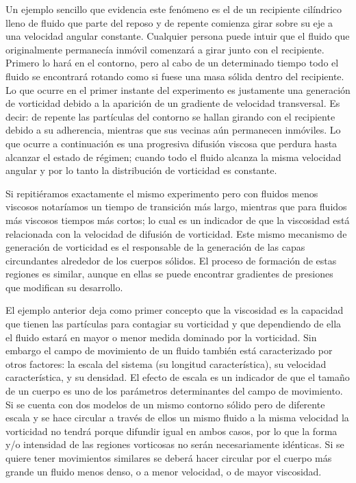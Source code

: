 \documentclass[12pt,twoside,onecolumn,openany]{article}
\begin{document}
Un ejemplo sencillo que evidencia este fenómeno es el de un recipiente cilíndrico lleno de fluido que parte del reposo y de repente comienza girar sobre su eje a una velocidad angular constante. Cualquier persona puede intuir que el fluido que originalmente permanecía inmóvil comenzará a girar junto con el recipiente. Primero lo hará en el contorno, pero al cabo de un determinado tiempo todo el fluido se encontrará rotando como si fuese una masa sólida dentro del recipiente. Lo que ocurre en el primer instante del experimento es justamente una generación de vorticidad debido a la aparición de un gradiente de velocidad transversal. Es decir: de repente las partículas del contorno se hallan girando con el recipiente debido a su adherencia, mientras que sus vecinas aún permanecen inmóviles. Lo que ocurre a continuación es una progresiva difusión viscosa que perdura hasta alcanzar el estado de régimen; cuando todo el fluido alcanza la misma velocidad angular y por lo tanto la distribución de vorticidad es constante.

Si repitiéramos exactamente el mismo experimento pero con fluidos menos viscosos notaríamos un tiempo de transición más largo, mientras que para fluidos más viscosos tiempos más cortos; lo cual es un indicador de que la viscosidad está relacionada con la velocidad de difusión de vorticidad. Este mismo mecanismo de generación de vorticidad es el responsable de la generación de las capas circundantes alrededor de los cuerpos sólidos. El proceso de formación de estas regiones es similar, aunque en ellas se puede encontrar gradientes de presiones que modifican su desarrollo.

El ejemplo anterior deja como primer concepto que la viscosidad es la capacidad que tienen las partículas para contagiar su vorticidad y que dependiendo de ella el fluido estará en mayor o menor medida dominado por la vorticidad. Sin embargo el campo de movimiento de un fluido también está caracterizado por otros factores: la escala del sistema (su longitud característica), su velocidad característica, y su densidad. El efecto de escala es un indicador de que el tamaño de un cuerpo es uno de los parámetros determinantes del campo de movimiento. Si se cuenta con dos modelos de un mismo contorno sólido pero de diferente escala y se hace circular a través de ellos un mismo fluido a la misma velocidad la vorticidad no tendrá porque difundir igual en ambos casos, por lo que la forma y/o intensidad de las regiones vorticosas no serán necesariamente idénticas. Si se quiere tener movimientos similares se deberá hacer circular por el cuerpo más grande un fluido menos denso, o a menor velocidad, o de mayor viscosidad.
\end{document}
